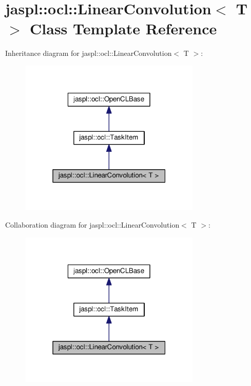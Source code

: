\hypertarget{classjaspl_1_1ocl_1_1_linear_convolution}{}\section{jaspl\+:\+:ocl\+:\+:Linear\+Convolution$<$ T $>$ Class Template Reference}
\label{classjaspl_1_1ocl_1_1_linear_convolution}


Inheritance diagram for jaspl\+:\+:ocl\+:\+:Linear\+Convolution$<$ T $>$\+:\nopagebreak
\begin{figure}[H]
\begin{center}
\leavevmode
\includegraphics[width=244pt]{classjaspl_1_1ocl_1_1_linear_convolution__inherit__graph}
\end{center}
\end{figure}


Collaboration diagram for jaspl\+:\+:ocl\+:\+:Linear\+Convolution$<$ T $>$\+:\nopagebreak
\begin{figure}[H]
\begin{center}
\leavevmode
\includegraphics[width=244pt]{classjaspl_1_1ocl_1_1_linear_convolution__coll__graph}
\end{center}
\end{figure}
